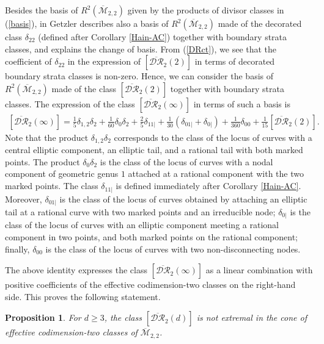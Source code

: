 \documentclass[10pt]{amsart}
\newtheorem{prop}{Proposition}[section]
\theoremstyle{definition}
\begin{document}
Besides the basis of $R^2({\overline{\mathcal{M}}}_{2,2})$ given by the products of divisor classes in (\ref{basis}), in \cite{MR1672112} Getzler describes also a basis of $R^2({\overline{\mathcal{M}}}_{2,2})$ made of the decorated class $\delta_{22}$ (defined after Corollary \ref{Hain-AC}) together with boundary strata classes, and explains the change of basis. 
From (\ref{DRct}), we see that the coefficient of $\delta_{22}$ in the expression of $\left[\overline{\mathcal{DR}}_2(2)\right]$ in terms of decorated boundary strata classes is non-zero. Hence, we can consider the basis of $R^2({\overline{\mathcal{M}}}_{2,2})$ made of the class $\left[\overline{\mathcal{DR}}_2(2)\right]$
together with boundary strata classes. The expression of the class $\left[\overline{\mathcal{DR}}_2(\infty)\right]$ in terms of such a basis is
\begin{eqnarray*}
\left[\overline{\mathcal{DR}}_2(\infty)\right] = \frac{1}{5} \delta_{1,2}\delta_2 + \frac{1}{60}\delta_0\delta_2 +\frac{2}{5} \delta_{11|} +\frac{1}{30} (\delta_{01|} + \delta_{0|}) + \frac{1}{360} \delta_{00} + \frac{1}{15} \left[\overline{\mathcal{DR}}_2(2)\right].
\end{eqnarray*}
Note that the product $\delta_{1,2}\delta_2$ corresponds to the class of the locus of curves with a central elliptic component, an elliptic tail, and a rational tail with both marked points. The product $\delta_{0}\delta_2$ is the class of the locus of curves with a nodal component of geometric genus $1$ attached at a rational component with the two marked points. The class $\delta_{11|}$ is defined immediately after Corollary \ref{Hain-AC}. 
Moreover, $\delta_{01|}$ is the class of the locus of curves obtained by attaching an elliptic tail at a rational curve with two marked points and an irreducible node; $\delta_{0|}$ is the class of the locus of curves with an elliptic component meeting a rational component in two points, and both marked points on the rational component; finally, $\delta_{00}$ is the class of the locus of curves with two non-disconnecting nodes.

The above identity expresses the class $\left[\overline{\mathcal{DR}}_2(\infty)\right]$ as a linear combination with positive coefficients of the effective codimension-two classes on the right-hand side.
This proves the following statement.

\begin{prop}
For $d\geq 3$, the class $\left[\overline{\mathcal{DR}}_2(d)\right]$ is not extremal in the cone of effective codimension-two classes of ${\overline{\mathcal{M}}}_{2,2}$.
\end{prop}
\end{document}
